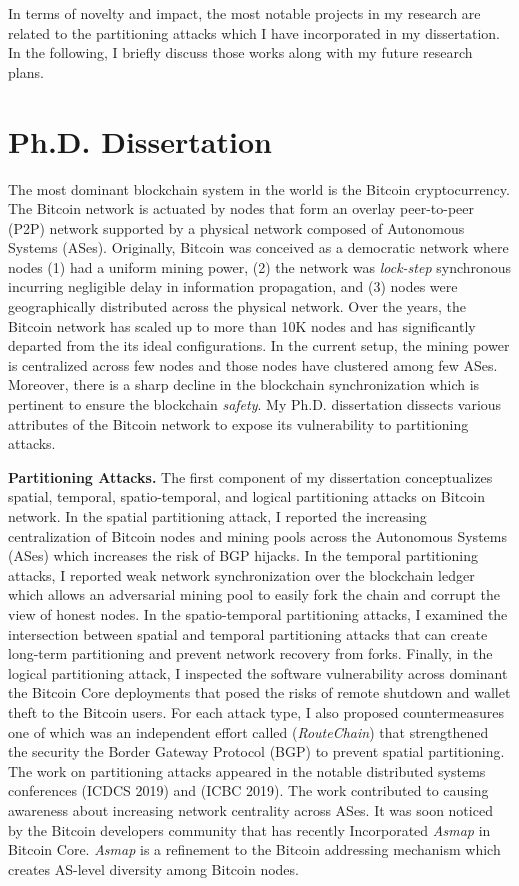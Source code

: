\documentclass{NSF}
\newcommand{\BfPara}[1]{{\noindent\textbf{#1.}}\xspace}
\begin{document}
In terms of novelty and impact, the most notable projects in my research are related to the partitioning attacks which I have incorporated in my dissertation. In the following, I briefly discuss those works along with my future research plans. 


\section{Ph.D. Dissertation}
The most dominant blockchain system in the world is the Bitcoin cryptocurrency. The Bitcoin network is actuated by nodes that form an overlay peer-to-peer (P2P) network supported by a physical network composed of Autonomous Systems (ASes). Originally, Bitcoin was conceived as a democratic network where nodes (1) had a uniform mining power, (2) the network was {\em lock-step} synchronous incurring negligible delay in information propagation, and (3) nodes were geographically distributed across the physical network. Over the years, the Bitcoin network has scaled up to more than 10K nodes and has significantly departed from the its ideal configurations. In the current setup, the mining power is centralized across few nodes and those nodes have clustered among few ASes. Moreover, there is a sharp decline in the blockchain synchronization which is pertinent to ensure the blockchain {\em safety}. My Ph.D. dissertation dissects various attributes of the Bitcoin network to expose its vulnerability to partitioning attacks.



\BfPara{Partitioning Attacks} The first component of my dissertation conceptualizes spatial, temporal, spatio-temporal, and logical partitioning attacks on Bitcoin network. In the spatial partitioning attack, I reported the increasing centralization of Bitcoin nodes and mining pools across the Autonomous Systems (ASes) which increases the risk of BGP hijacks. In the temporal partitioning attacks, I reported weak network synchronization over the blockchain ledger which allows an adversarial mining pool to easily fork the chain and corrupt the view of honest nodes. In the spatio-temporal partitioning attacks, I examined the intersection between spatial and temporal partitioning attacks that can create long-term partitioning and prevent network recovery from forks. Finally, in the logical partitioning attack, I inspected the software vulnerability across dominant the Bitcoin Core deployments that posed the risks of remote shutdown and wallet theft to the Bitcoin users. For each attack type, I also proposed countermeasures one of which was an independent effort called ({\em RouteChain}) that strengthened the security the Border Gateway Protocol (BGP) to prevent spatial partitioning. The work on partitioning attacks appeared in the notable distributed systems conferences (ICDCS 2019) and (ICBC 2019). The work contributed to causing awareness about increasing network centrality across ASes. It was soon noticed by the Bitcoin developers community that has recently Incorporated {\em Asmap} in Bitcoin Core. {\em Asmap} is a refinement to the Bitcoin addressing mechanism which creates AS-level diversity among Bitcoin nodes. 
\end{document}

